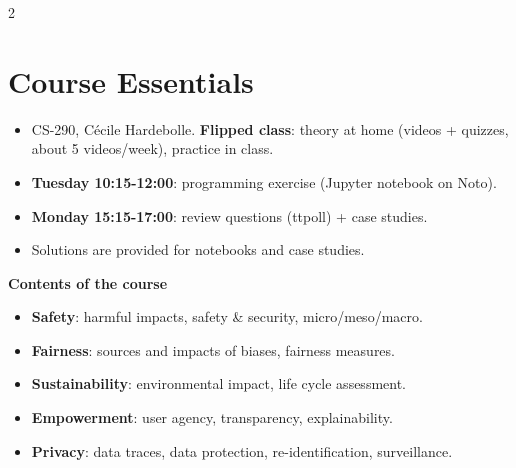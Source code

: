 \documentclass[a4paper,9pt]{extarticle}
\begin{document}

\thispagestyle{fancy}



\begin{multicols}{2}


\section{Course Essentials}


\begin{summary}

\begin{itemize}

\item CS-290, C\'ecile Hardebolle. \textbf{Flipped class}: theory at home (videos + quizzes,
about 5 videos/week), practice in class.

\item \textbf{Tuesday 10:15-12:00}: programming exercise (Jupyter notebook on Noto).

\item \textbf{Monday 15:15-17:00}: review questions (ttpoll) + case studies.

\item Solutions are provided for notebooks and case studies.

\end{itemize}

\end{summary}


\textbf{Contents of the course}

\begin{itemize}

\item \textbf{Safety}: harmful impacts, safety \& security, micro/meso/macro.

\item \textbf{Fairness}: sources and impacts of biases, fairness measures.

\item \textbf{Sustainability}: environmental impact, life cycle assessment.

\item \textbf{Empowerment}: user agency, transparency, explainability.

\item \textbf{Privacy}: data traces, data protection, re-identification, surveillance.


\end{itemize}
\end{multicols}
\end{document}
